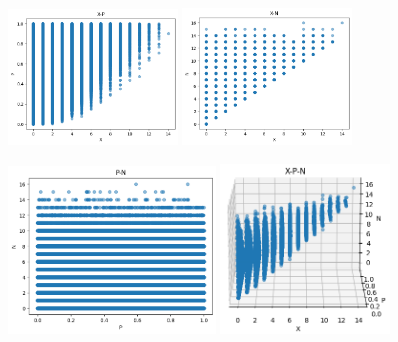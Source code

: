 \begin{homeworkProblem}
\begin{figure}[h]
    \centering
    \includegraphics[width=0.4\textwidth]{./figure/p9/X_P.png}
    \includegraphics[width=0.4\textwidth]{./figure/p9/X_N.png}
\end{figure}
\begin{figure}[h]
    \centering
    \includegraphics[width=0.49\textwidth]{./figure/p9/P_N.png}
    \includegraphics[width=0.4\textwidth]{./figure/p9/X_P_N.png}
\end{figure}


\end{homeworkProblem}
